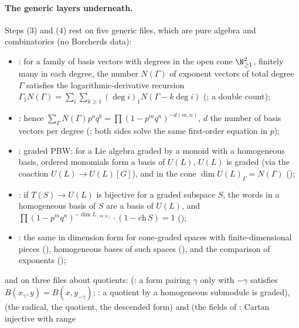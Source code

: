 \paragraph{The generic layers underneath.}  Steps (3) and (4) rest on five generic files, which are pure algebra and
combinatorics (no Borcherds data):
\begin{itemize}
\item {}: for a family of basis vectors with degrees in the open cone $\N_{\ge1}^2$,
  finitely many in each degree, the number $N(\Gamma)$ of exponent vectors of total degree $\Gamma$ satisfies the
  logarithmic-derivative recursion $\Gamma_1N(\Gamma)=\sum_i\sum_{k\ge1}(\deg i)_1N(\Gamma-k\deg i)$ (; a
  double count);
\item {}: hence $\sum_\Gamma N(\Gamma)p^aq^b=\prod(1-p^mq^n)^{-d(m,n)}$, $d$ the number of
  basis vectors per degree (; both sides solve the same first-order equation in $p$);
\item {}: graded PBW: for a Lie algebra graded by a monoid with a homogeneous basis,
  ordered monomials form a basis of $U(L)$, $U(L)$ is graded (via the coaction $U(L)\to U(L)[G]$), and in the cone
  $\dim U(L)_\Gamma=N(\Gamma)$ ();
\item {}: if $T(S)\to U(L)$ is bijective for a graded subspace $S$, the words in a
  homogeneous basis of $S$ are a basis of $U(L)$, and
  $\prod(1-p^mq^n)^{-\dim L_{(m,n)}}\cdot(1-\mathrm{ch}\,S)=1$ ();
\item {}: the same in dimension form for cone-graded spaces with finite-dimensional
  pieces (), homogeneous bases of such spaces (), and
  the comparison of exponents ();
\end{itemize}
and on three files about quotients:  (: a form pairing
$\gamma$ only with $-\gamma$ satisfies $B(x_\gamma,y)=B(x,y_{-\gamma})$; : a quotient by a homogeneous submodule is
graded),  (the radical, the quotient, the descended form) and
 (the fields of : Cartan injective with range
